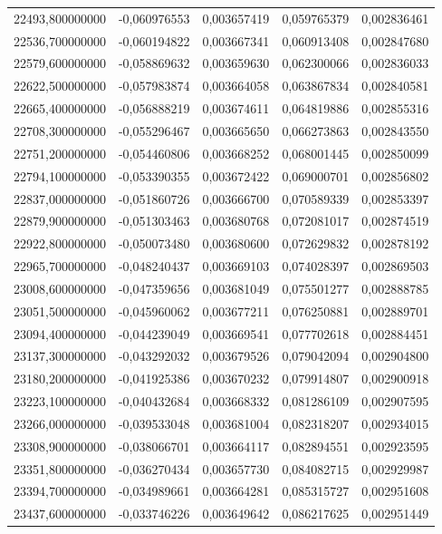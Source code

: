 \begin{longtable}{rrrrr}
22493,800000000 & -0,060976553 & 0,003657419 & 0,059765379 & 0,002836461\\
22536,700000000 & -0,060194822 & 0,003667341 & 0,060913408 & 0,002847680\\
22579,600000000 & -0,058869632 & 0,003659630 & 0,062300066 & 0,002836033\\
22622,500000000 & -0,057983874 & 0,003664058 & 0,063867834 & 0,002840581\\
22665,400000000 & -0,056888219 & 0,003674611 & 0,064819886 & 0,002855316\\
22708,300000000 & -0,055296467 & 0,003665650 & 0,066273863 & 0,002843550\\
22751,200000000 & -0,054460806 & 0,003668252 & 0,068001445 & 0,002850099\\
22794,100000000 & -0,053390355 & 0,003672422 & 0,069000701 & 0,002856802\\
22837,000000000 & -0,051860726 & 0,003666700 & 0,070589339 & 0,002853397\\
22879,900000000 & -0,051303463 & 0,003680768 & 0,072081017 & 0,002874519\\
22922,800000000 & -0,050073480 & 0,003680600 & 0,072629832 & 0,002878192\\
22965,700000000 & -0,048240437 & 0,003669103 & 0,074028397 & 0,002869503\\
23008,600000000 & -0,047359656 & 0,003681049 & 0,075501277 & 0,002888785\\
23051,500000000 & -0,045960062 & 0,003677211 & 0,076250881 & 0,002889701\\
23094,400000000 & -0,044239049 & 0,003669541 & 0,077702618 & 0,002884451\\
23137,300000000 & -0,043292032 & 0,003679526 & 0,079042094 & 0,002904800\\
23180,200000000 & -0,041925386 & 0,003670232 & 0,079914807 & 0,002900918\\
23223,100000000 & -0,040432684 & 0,003668332 & 0,081286109 & 0,002907595\\
23266,000000000 & -0,039533048 & 0,003681004 & 0,082318207 & 0,002934015\\
23308,900000000 & -0,038066701 & 0,003664117 & 0,082894551 & 0,002923595\\
23351,800000000 & -0,036270434 & 0,003657730 & 0,084082715 & 0,002929987\\
23394,700000000 & -0,034989661 & 0,003664281 & 0,085315727 & 0,002951608\\
23437,600000000 & -0,033746226 & 0,003649642 & 0,086217625 & 0,002951449\\

\end{longtable}

